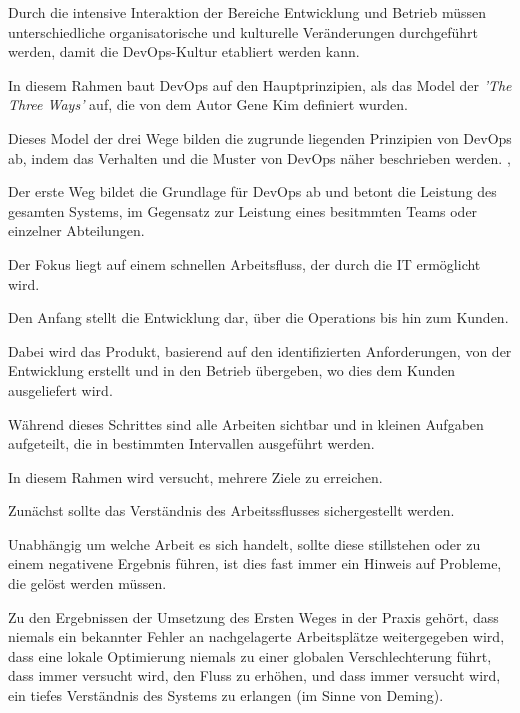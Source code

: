 Durch die intensive Interaktion der Bereiche Entwicklung und Betrieb müssen unterschiedliche organisatorische und kulturelle Veränderungen durchgeführt werden, damit die DevOps-Kultur etabliert werden kann. 

In diesem Rahmen baut DevOps auf den Hauptprinzipien, als das Model der \textit{'The Three Ways'} auf, die von dem Autor Gene Kim \cite{kim_devops-handbuch_2017} definiert wurden. 

Dieses Model der drei Wege bilden die zugrunde liegenden Prinzipien von DevOps ab, indem das Verhalten und die Muster von DevOps näher beschrieben werden. \cite[S. 9 - 11]{kim_devops-handbuch_2017}, \cite{kim_three_2012}  

Der erste Weg bildet die Grundlage für DevOps ab und betont die Leistung des gesamten Systems, im Gegensatz zur Leistung eines besitmmten Teams oder einzelner Abteilungen. 

Der Fokus liegt auf einem schnellen Arbeitsfluss, der durch die IT ermöglicht wird. 

Den Anfang stellt die Entwicklung dar, über die Operations bis hin zum Kunden.

Dabei wird das Produkt, basierend auf den identifizierten Anforderungen, von der Entwicklung erstellt und in den Betrieb übergeben, wo dies dem Kunden ausgeliefert wird. 

Während dieses Schrittes sind alle Arbeiten sichtbar und in kleinen Aufgaben aufgeteilt, die in bestimmten Intervallen ausgeführt werden. 

In diesem Rahmen wird versucht, mehrere Ziele zu erreichen. 

Zunächst sollte das Verständnis des Arbeitssflusses sichergestellt werden. 

Unabhängig um welche Arbeit es sich handelt, sollte diese stillstehen oder zu einem negativene Ergebnis führen, ist dies fast immer ein Hinweis auf Probleme, die gelöst werden müssen. 




Zu den Ergebnissen der Umsetzung des Ersten Weges in der Praxis gehört, dass niemals ein bekannter Fehler an nachgelagerte Arbeitsplätze weitergegeben wird, dass eine lokale Optimierung niemals zu einer globalen Verschlechterung führt, dass immer versucht wird, den Fluss zu erhöhen, und dass immer versucht wird, ein tiefes Verständnis des Systems zu erlangen (im Sinne von Deming).


